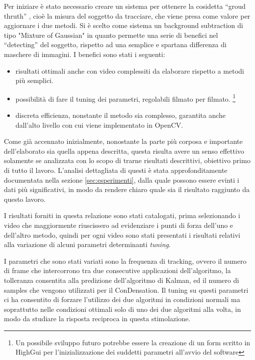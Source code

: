 Per iniziare è stato necessario creare un sistema per ottenere la cosidetta ``groud thruth'' , cioè la misura del soggetto da tracciare, che viene presa come valore per aggiornare i due metodi.
Si è scelto come sistema un background subtraction di tipo "Mixture of Gaussian" in quanto permette una serie di benefici nel ``detecting'' del soggetto, rispetto ad una semplice e spartana differenza di maschere di immagini. I benefici sono stati i seguenti:

\begin{itemize}
\item risultati ottimali anche con video complessiti da elaborare rispetto a metodi più semplici.
\item possibilità di fare il tuning dei parametri, regolabili filmato per filmato. \footnote{Un possibile sviluppo futuro potrebbe essere la creazione di un form scritto in HighGui per l'inizializzazione dei suddetti parametri all'avvio del software}
\item discreta efficienza, nonstante il metodo sia complesso, garantita anche dall'alto livello con cui viene implementato in OpenCV.
\end{itemize}

Come già accennato inizialmente, nonostante la parte più corposa e importante dell'elaborato sia quella appena descritta, questa risulta avere un senso effettivo solamente se analizzata con lo scopo di trarne risultati descrittivi, obiettivo primo di tutto il lavoro. L'analisi dettagliata di questi è stata approfonditamente documentata nella sezione \ref{sec:esperimenti}, dalla quale possono essere evinti i dati più significativi, in modo da rendere chiaro quale sia il risultato raggiunto da questo lavoro. 

I risultati forniti in questa relazione sono stati catalogati, prima selezionando i video che maggiormente riuscissero ad evidenziare i punti di forza dell'uno e dell'altro metodo, quindi per ogni video sono stati presentati i risultati relativi alla variazione di alcuni parametri determinanti \emph{tuning}. 

I parametri che sono stati variati sono la frequenza di tracking, ovvero il numero di frame che intercorrono tra due consecutive applicazioni dell'algoritmo, la tolleranza consentita alla predizione dell'algoritmo di Kalman, ed il numero di samples che vengono utilizzati per il ConDensation. Il tuning su questi parametri ci ha consentito di forzare l'utilizzo dei due algoritmi in condizioni normali ma soprattutto nelle condizioni ottimali solo di uno dei due algoritmi alla volta, in modo da studiare la risposta reciproca in questa stimolazione.

